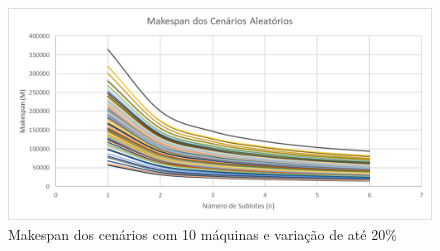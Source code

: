 \begin{figure}[!ht]
    \centering
    \includegraphics[width=12cm]{Resultados/Figuras/M10_20}
    \caption{Makespan dos cenários com 10 máquinas e variação de até 20\%}
    \label{fig:M10_20}
\end{figure}